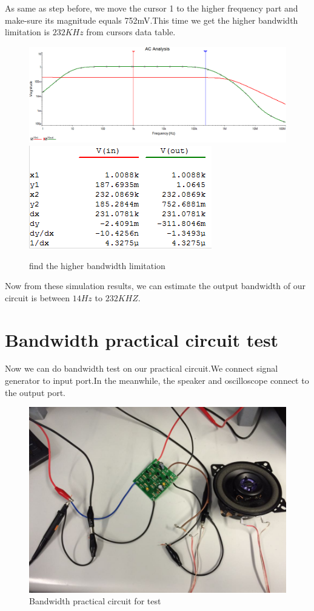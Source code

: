 As same as step before, we move the cursor 1 to the higher frequency part and make-sure its magnitude equals 752mV.This time we get the higher bandwidth limitation is $232KHz$ from cursors data table.
\begin{figure}[htbp]
\centering
\includegraphics[scale=0.45]{"../Photo/Chap7/higher band"}\\[0.5cm]
\includegraphics[scale=1]{"../Photo/Chap7/higher bandwoth data"}
\caption{find the higher bandwidth limitation}
\label{fig:find the higher bandwidth limitation}
\end{figure}

Now from these simulation results, we can estimate the output bandwidth of our circuit is between $14Hz$ to $232KHZ$.

\section{Bandwidth practical circuit test}
Now we can do bandwidth test on our practical circuit.We connect signal generator to input port.In the meanwhile, the speaker and oscilloscope connect to the output port.
\begin{figure}[htbp]
\centering
\includegraphics[scale=0.6]{"../Photo/Chap7/practical circuit"}
\caption{Bandwidth practical circuit for test}
\label{fig:Bandwidth practical circuit for test}
\end{figure}

